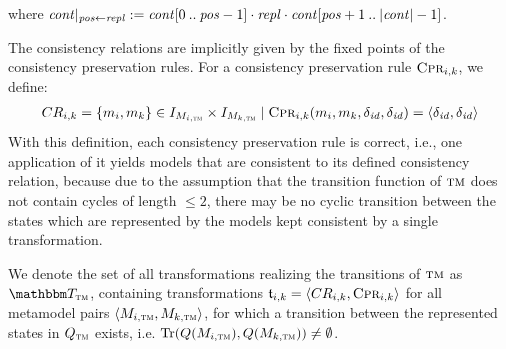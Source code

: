where $\mathit{cont}|_{\mathit{pos} \gets \mathit{repl}} := \mathit{cont}[0\:..\:\mathit{pos}-1] \cdot \mathit{repl} \cdot \mathit{cont}[\mathit{pos}+1\:..\:|\mathit{cont}|-1]$.

The consistency relations are implicitly given by the fixed points of the consistency preservation rules.
For a consistency preservation rule $\textsc{Cpr}_{i,k}$, we define:
\begin{align*}
    CR_{i,k} = \{ m_{i}, m_{k} \} \in I_{M_{i,\textsc{tm}}} \times I_{M_{k,\textsc{tm}}} \mid \textsc{Cpr}_{i,k}(m_{i},m_{k},\delta_{\mathit{id}},\delta_{\mathit{id}}) = \langle \delta_{\mathit{id}},\delta_{\mathit{id}} \rangle
\end{align*} 
With this definition, each consistency preservation rule is correct, i.e., one application of it yields models that are consistent to its defined consistency relation, because due to the assumption that the transition function of $\textsc{tm}$ does not contain cycles of length $\leq 2$, there may be no cyclic transition between the states which are represented by the models kept consistent by a single transformation.

We denote the set of all transformations realizing the transitions of $\textsc{tm}$ as $\transformationset{T}_{\TuringMachine}$, containing transformations $\mathfrak{t}_{i,k} = \langle CR_{i,k},\textsc{Cpr}_{i,k} \rangle$ for all metamodel pairs $\langle M_{i,\textsc{tm}},M_{k,\textsc{tm}} \rangle$, for which a transition between the represented states in $Q_{\textsc{tm}}$ exists, i.e. $\operatorname{Tr}(Q(M_{i,\textsc{tm}}),Q(M_{k,\textsc{tm}})) \neq \emptyset$.

